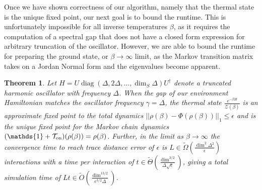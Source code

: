 \documentclass{article}
\newtheorem{theorem}{Theorem}
\newcommand{\on}{\rm on}
\newcommand{\norm}[1]{\left| \left| #1 \right| \right|}
\newcommand{\bigotilde}[1]{\widetilde{O} \left( #1 \right)}
\newcommand{\partfun}{\mathcal{Z}}
\newcommand{\identity}{\mathds{1}}
\DeclareMathOperator{\diag}{diag}
\begin{document}
Once we have shown correctness of our algorithm, namely that the thermal state is the unique fixed point, our next goal is to bound the runtime. This is unfortunately impossible for all inverse temperatures $\beta$, as it requires the computation of a spectral gap that does not have a closed form expression for arbitrary truncation of the oscillator. However, we are able to bound the runtime for preparing the ground state, or $\beta \to \infty$ limit, as the Markov transition matrix takes on a Jordan Normal form and the eigenvalues become apparent.  


\begin{theorem}\label{thm:harmonic_oscillator}
    Let $H = U \diag(\Delta , 2 \Delta , \ldots, \dim_S \Delta) U^\dagger$ denote a truncated harmonic oscillator with frequency $\Delta$. When the gap of our environment Hamiltonian matches the oscillator frequency $\gamma = \Delta$, the thermal state $\frac{e^{-\beta H}}{\partfun(\beta)}$ is an approximate fixed point to the total dynamics $\norm{\rho(\beta) - \Phi(\rho(\beta))}_1 \le \epsilon$ and is the unique fixed point for the Markov chain dynamics $(\identity + \mathcal{T}_{\on})(\rho(\beta)) = \rho(\beta)$. Further, in the limit as $\beta \to \infty$ the convergence time to reach trace distance error of $\epsilon$ is $L \in \widetilde{\Omega}\left(\frac{\dim^2 \Delta^2 }{\epsilon} \right)$ interactions with a time per interaction of $t \in \widetilde{\Theta}\left( \frac{\dim^{3/2}}{\Delta \sqrt{\epsilon}}\right)$, giving a total simulation time of $L t \in \bigotilde{\frac{\dim^{13/2}}{\epsilon^{3/2} \Delta}}$.
\end{theorem}
\end{document}
